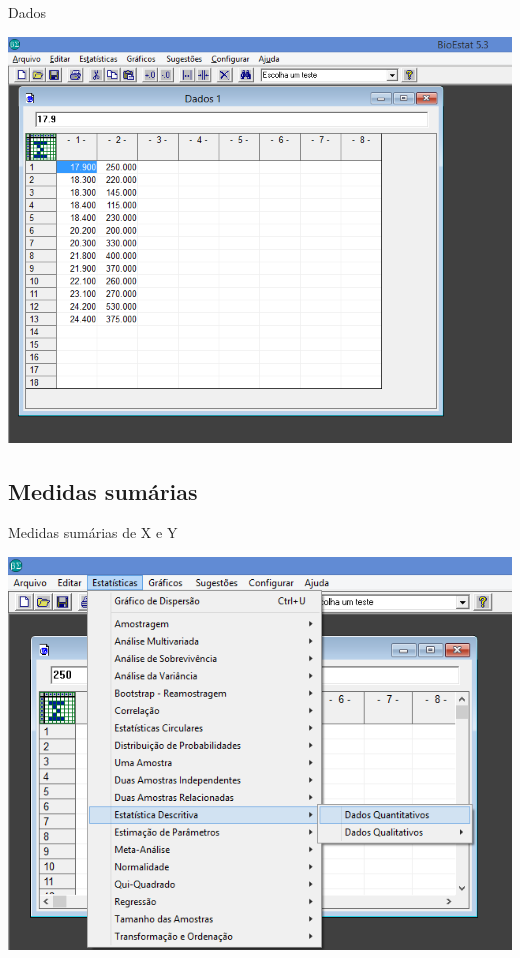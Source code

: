 \documentclass{beamer}
\begin{document}
\begin{frame}{Dados}
  \begin{center}
    \includegraphics[height=0.9\textheight]{dados}
  \end{center}
\end{frame}

\subsection{Medidas sumárias}

\begin{frame}{Medidas sumárias de X e Y}
  \begin{center}
    \includegraphics[height=0.9\textheight]{selecao_descritiva}
  \end{center}
\end{frame}
\end{document}

